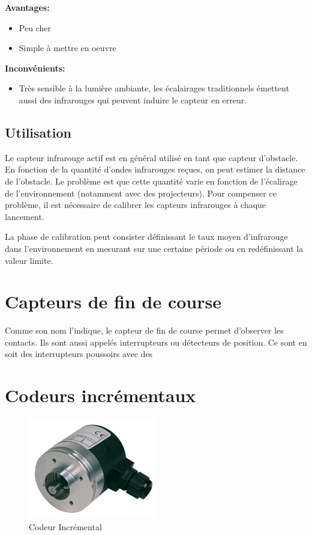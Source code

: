 \documentclass[a4paper, 11pt]{report}
\begin{document}
\textbf{Avantages:}
\begin{itemize}
\item Peu cher
\item Simple à mettre en oeuvre
\end{itemize}

\textbf{Inconvénients:}
\begin{itemize}
\item Très sensible à la lumière ambiante, les écalairages traditionnels émettent aussi des infrarouges qui peuvent induire le capteur en erreur.
\end{itemize}

\subsection{Utilisation}
Le capteur infrarouge actif est en général utilisé en tant que capteur d'obstacle. En fonction de la quantité d'ondes infrarouges reçues, on peut estimer la distance de l'obstacle. Le problème est que cette quantité varie en fonction de l'écalirage de l'environnement (notamment avec des projecteurs). Pour compenser ce problème, il est nécessaire de calibrer les capteurs infrarouges à chaque lancement.

La phase de calibration peut consister définissant le taux moyen d'infrarouge dans l'environnement en mesurant sur une certaine période ou en redéfinissant la valeur limite.

\section{Capteurs de fin de course}
Comme son nom l'indique, le capteur de fin de course permet d'observer les contacts. Ils sont aussi appelés interrupteurs ou détecteurs de position. Ce sont en soit des interrupteurs poussoirs avec des 


\section{Codeurs incrémentaux}

\begin{figure}[h]
\begin{centering}
\includegraphics[width=0.5\textwidth]{images/photoCodeurIncremental.JPG}
\caption{Codeur Incrémental}
\par\end{centering}
\end{figure}
\end{document}
